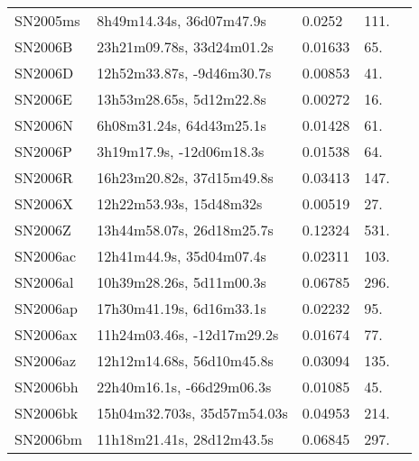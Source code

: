 \begin{longtable}{lllll}
         SN2005ms &       8h49m14.34s, 36d07m47.9s &   0.0252 &           111. &    \citet{1991RC3.9.C...0000d} \\
          SN2006B &      23h21m09.78s, 33d24m01.2s &  0.01633 &            65. &    \citet{1991RC3.9.C...0000d} \\
          SN2006D &      12h52m33.87s, -9d46m30.7s &  0.00853 &            41. &  \citet{2004AandA...416..515D} \\
          SN2006E &       13h53m28.65s, 5d12m22.8s &  0.00272 &            16. &    \citet{1991RC3.9.C...0000d} \\
          SN2006N &       6h08m31.24s, 64d43m25.1s &  0.01428 &            61. &    \citet{1999PASP..111..438F} \\
          SN2006P &       3h19m17.9s, -12d06m18.3s &  0.01538 &            64. &    \citet{2005AJ....130.1037C} \\
          SN2006R &      16h23m20.82s, 37d15m49.8s &  0.03413 &           147. &    \citet{1995ApJS...99..391H} \\
          SN2006X &        12h22m53.93s, 15d48m32s &  0.00519 &            27. &    \citet{2006SDSS5.C...0000:} \\
          SN2006Z &      13h44m58.07s, 26d18m25.7s &  0.12324 &           531. &    \citet{2007SDSS6.C...0000:} \\
         SN2006ac &       12h41m44.9s, 35d04m07.4s &  0.02311 &           103. &    \citet{1991RC3.9.C...0000d} \\
         SN2006al &       10h39m28.26s, 5d11m00.3s &  0.06785 &           296. &    \citet{2004SDSS2.C...0000:} \\
         SN2006ap &       17h30m41.19s, 6d16m33.1s &  0.02232 &            95. &    \citet{1992ApJS...79..157F} \\
         SN2006ax &     11h24m03.46s, -12d17m29.2s &  0.01674 &            77. &    \citet{2006HIPAS.C...0000:} \\
         SN2006az &      12h12m14.68s, 56d10m45.8s &  0.03094 &           135. &    \citet{1991RC3.9.C...0000d} \\
         SN2006bh &      22h40m16.1s, -66d29m06.3s &  0.01085 &            45. &    \citet{2004AJ....128...16K} \\
         SN2006bk &    15h04m32.703s, 35d57m54.03s &  0.04953 &           214. &    \citet{1995ApJS...99..391H} \\
         SN2006bm &      11h18m21.41s, 28d12m43.5s &  0.06845 &           297. &    \citet{2007SDSS6.C...0000:} \\

\end{longtable}

